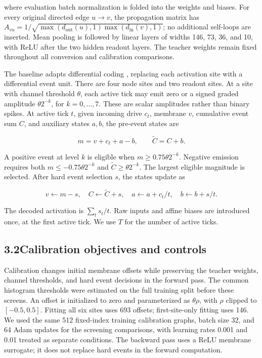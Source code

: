 \documentclass[11pt]{article}
\begin{document}
where evaluation batch normalization is folded into the weights and biases. For every original directed edge $u\to v$, the propagation matrix has $A_{vu}=1/\sqrt{\max(d_{\mathrm{out}}(u),1)\max(d_{\mathrm{in}}(v),1)}$; no additional self-loops are inserted. Mean pooling is followed by linear layers of widths 146, 73, 36, and 10, with ReLU after the two hidden readout layers. The teacher weights remain fixed throughout all conversion and calibration comparisons.

The baseline adapts differential coding \citep{huang2025}, replacing each activation site with a differential event unit. There are four node sites and two readout sites. At a site with channel threshold $\theta$, each active tick may emit zero or a signed graded amplitude $\theta 2^{-k}$, for $k=0,\ldots,7$. These are scalar amplitudes rather than binary spikes. At active tick $t$, given incoming drive $c_t$, membrane $v$, cumulative event sum $C$, and auxiliary states $a,b$, the pre-event states are

\[
m=v+c_t+a-b,\qquad \widetilde C=C+b.
\]

A positive event at level $k$ is eligible when $m\geq 0.75\theta 2^{-k}$. Negative emission requires both $m\leq-0.75\theta 2^{-k}$ and $\widetilde C\geq\theta 2^{-k}$. The largest eligible magnitude is selected. After hard event selection $s$, the states update as

\[
v\leftarrow m-s,\quad C\leftarrow\widetilde C+s,\quad a\leftarrow a+c_t/t,\quad b\leftarrow b+s/t.
\]

The decoded activation is $\sum_t s_t/t$. Raw inputs and affine biases are introduced once, at the first active tick. We use $T$ for the number of active ticks.

\subsection*{3.2\quad Calibration objectives and controls}

Calibration changes initial membrane offsets while preserving the teacher weights, channel thresholds, and hard event decisions in the forward pass. The common histogram thresholds were estimated on the full training split before these screens. An offset is initialized to zero and parameterized as $\theta\rho$, with $\rho$ clipped to $[-0.5,0.5]$. Fitting all six sites uses 693 offsets; first-site-only fitting uses 146. We used the same 512 fixed-index training calibration graphs, batch size 32, and 64 Adam updates for the screening comparisons, with learning rates 0.001 and 0.01 treated as separate conditions. The backward pass uses a ReLU membrane surrogate; it does not replace hard events in the forward computation.
\end{document}
